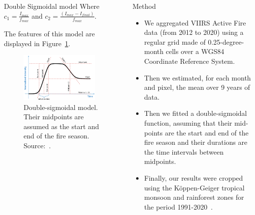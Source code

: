 \documentclass[20pt]{beamer}
\begin{document}
\begin{frame}[fragile,t]
\begin{columns}[t]
\begin{column}{0.33\linewidth}
\begin{block}{Double Sigmoidal model\vphantom{g}}
Where $c_{1} = \frac{I_{max}}{f_{max}}$ and $c_{2} = \frac{(I_{max} - I_{final})}{f_{max}}$.

    \vspace{0.5cm}

The features of this model are displayed in Figure~\ref{fig:double-sigmoidal_model}.

\begin{figure}[ht]
    \centering
    \includegraphics[width=0.9\textwidth]{images/caglar2018_double_sigmoidal_model.png}
    \caption{Double-sigmoidal model. Their midpoints are assumed as the start and end of the fire season. Source:~\cite{caglar2018}.}
    \label{fig:double-sigmoidal_model}
\end{figure}


    \end{block}

\end{column}




\begin{column}{0.33\linewidth}

    \vspace{1.0cm}

    \begin{block}{Method\vphantom{g}}
\vspace{1cm}
\begin{itemize}
    \item We aggregated VIIRS Active Fire data (from 2012 to 2020) using a regular grid made of 0.25-degree-month cells over a WGS84 Coordinate Reference System.
    \item Then we estimated, for each month and pixel, the mean over 9 years of data.
    \item Then we fitted a double-sigmoidal function, assuming that their mid-points are the start and end of the fire season and their durations are the time intervals between midpoints. 
    \item Finally, our results were cropped using the K\"{o}ppen-Geiger tropical monsoon and rainforest zones for the period 1991-2020~\cite{beck2023}.
\end{itemize}


\end{block}
\end{column}
\end{columns}
\end{frame}
\end{document}

